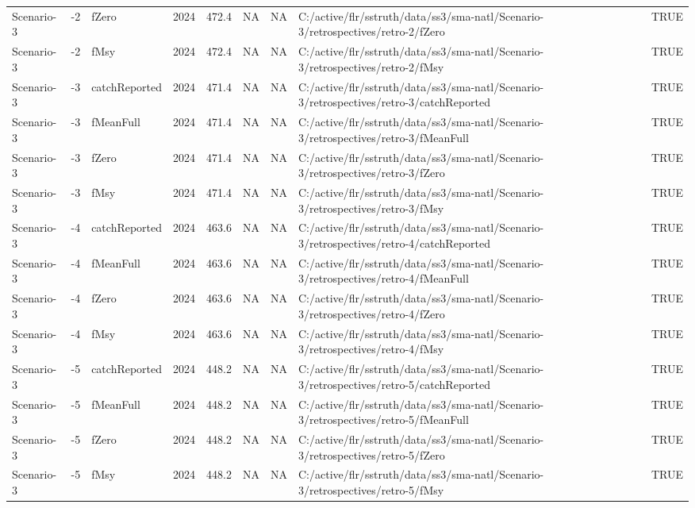 \begin{table}
\begin{tabular}[t]{lllrrrrll}
Scenario-3 & -2 & fZero & 2024 & 472.4 & NA & NA & C:/active/flr/sstruth/data/ss3/sma-natl/Scenario-3/retrospectives/retro-2/fZero & TRUE\\
\addlinespace
Scenario-3 & -2 & fMsy & 2024 & 472.4 & NA & NA & C:/active/flr/sstruth/data/ss3/sma-natl/Scenario-3/retrospectives/retro-2/fMsy & TRUE\\
Scenario-3 & -3 & catchReported & 2024 & 471.4 & NA & NA & C:/active/flr/sstruth/data/ss3/sma-natl/Scenario-3/retrospectives/retro-3/catchReported & TRUE\\
Scenario-3 & -3 & fMeanFull & 2024 & 471.4 & NA & NA & C:/active/flr/sstruth/data/ss3/sma-natl/Scenario-3/retrospectives/retro-3/fMeanFull & TRUE\\
Scenario-3 & -3 & fZero & 2024 & 471.4 & NA & NA & C:/active/flr/sstruth/data/ss3/sma-natl/Scenario-3/retrospectives/retro-3/fZero & TRUE\\
Scenario-3 & -3 & fMsy & 2024 & 471.4 & NA & NA & C:/active/flr/sstruth/data/ss3/sma-natl/Scenario-3/retrospectives/retro-3/fMsy & TRUE\\
\addlinespace
Scenario-3 & -4 & catchReported & 2024 & 463.6 & NA & NA & C:/active/flr/sstruth/data/ss3/sma-natl/Scenario-3/retrospectives/retro-4/catchReported & TRUE\\
Scenario-3 & -4 & fMeanFull & 2024 & 463.6 & NA & NA & C:/active/flr/sstruth/data/ss3/sma-natl/Scenario-3/retrospectives/retro-4/fMeanFull & TRUE\\
Scenario-3 & -4 & fZero & 2024 & 463.6 & NA & NA & C:/active/flr/sstruth/data/ss3/sma-natl/Scenario-3/retrospectives/retro-4/fZero & TRUE\\
Scenario-3 & -4 & fMsy & 2024 & 463.6 & NA & NA & C:/active/flr/sstruth/data/ss3/sma-natl/Scenario-3/retrospectives/retro-4/fMsy & TRUE\\
Scenario-3 & -5 & catchReported & 2024 & 448.2 & NA & NA & C:/active/flr/sstruth/data/ss3/sma-natl/Scenario-3/retrospectives/retro-5/catchReported & TRUE\\
\addlinespace
Scenario-3 & -5 & fMeanFull & 2024 & 448.2 & NA & NA & C:/active/flr/sstruth/data/ss3/sma-natl/Scenario-3/retrospectives/retro-5/fMeanFull & TRUE\\
Scenario-3 & -5 & fZero & 2024 & 448.2 & NA & NA & C:/active/flr/sstruth/data/ss3/sma-natl/Scenario-3/retrospectives/retro-5/fZero & TRUE\\
Scenario-3 & -5 & fMsy & 2024 & 448.2 & NA & NA & C:/active/flr/sstruth/data/ss3/sma-natl/Scenario-3/retrospectives/retro-5/fMsy & TRUE\\

\end{tabular}
\end{table}
